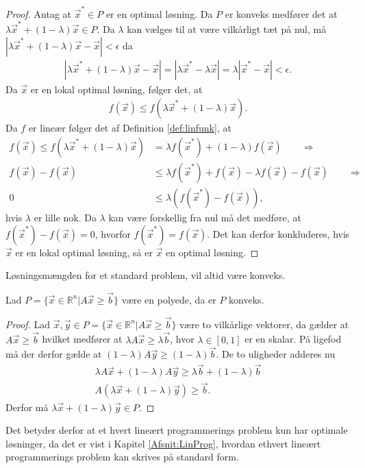 \begin{proof}
Antag at $\vec{x}^* \in P$ er en optimal løsning.
Da $P$ er konveks medfører det at $\lambda \vec{x}^* + (1-\lambda)\vec{x} \in P$. 
Da $\lambda$ kan vælges til at være vilkårligt tæt på nul, må $|\lambda \vec{x}^* + (1-\lambda)\vec{x} - \vec{x}| < \epsilon$ da
\begin{align*}
 |\lambda \vec{x}^* + (1-\lambda)\vec{x} - \vec{x}| = | \lambda \vec{x}^* - \lambda\vec{x}| = \lambda|\vec{x}^* - \vec{x}| < \epsilon.
\end{align*}
Da $\vec{x}$ er en lokal optimal løsning, følger det, at
\begin{align*}
f(\vec{x}) \leq f(\lambda \vec{x}^* + (1-\lambda)\vec{x}).
\end{align*}
Da $f$ er lineær følger det af Definition \ref{def:linfunk}, at 
\begin{align*}
f(\vec{x}) \leq f(\lambda \vec{x}^* + (1-\lambda)\vec{x}) &= \lambda f(\vec{x}^*) + (1-\lambda)f(\vec{x}) \qquad \Rightarrow
\\ f(\vec{x}) - f(\vec{x}) &\leq \lambda f(\vec{x}^*) + f(\vec{x})-\lambda f(\vec{x}) - f(\vec{x}) \qquad \Rightarrow
\\ 0 & \leq \lambda( f(\vec{x}^*) - f(\vec{x})),
\end{align*}
hvis $\lambda$ er lille nok.
Da $ \lambda$ kan være forskellig fra nul må det medføre, at $f(\vec{x}^*) - f(\vec{x}) = 0$, hvorfor $f(\vec{x}^*) =f(\vec{x})$. 
Det kan derfor konkluderes, hvis $\vec{x}$ er en lokal optimal løsning, så er $\vec{x}$ en optimal løsning.
\end{proof}
Løsningsmængden  for et standard problem, vil altid være konveks.
\begin{stn}
Lad $P =\{ \vec{x} \in \mathds{R}^n | A \vec{x} \geq \vec{b}\} $ være en polyede, da er $P$ konveks.
\label{stn:polykon}
\end{stn}
\begin{proof}
Lad $\vec{x}, \vec{y} \in P=\{ \vec{x} \in \mathds{R}^n | A \vec{x} \geq \vec{b}\}$ være to vilkårlige vektorer, da gælder at $A\vec{x} \geq \vec{b}$ hvilket medfører at $\lambda A \vec{x} \geq \lambda\vec{b}$, hvor $\lambda \in [0,1]$ er en skalar. 
På ligefod må der derfor gælde at $(1-\lambda)A\vec{y} \geq (1-\lambda)\vec{b}$.
De to uligheder adderes nu
\begin{align*}
\lambda A \vec{x} + (1-\lambda) A \vec{y} \geq \lambda \vec{b} + (1 - \lambda) \vec{b}
\\  A (\lambda\vec{x} + (1-\lambda)\vec{y}) \geq \vec{b}.
\end{align*}
Derfor må $\lambda\vec{x} + (1-\lambda)\vec{y} \in P$.
\end{proof}
Det betyder derfor at et hvert lineært programmerings problem kun har optimale løsninger, da det er vist i Kapitel \ref{Afsnit:LinProg}, hvordan ethvert lineært programmerings problem kan skrives på standard form.

